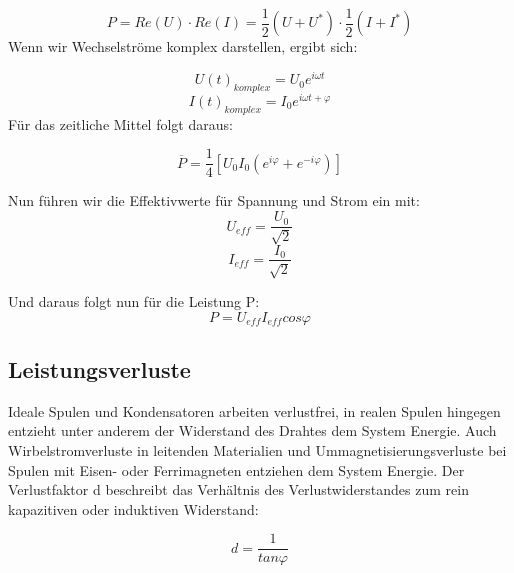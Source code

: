 \begin{equation}
P=Re(U)\cdot Re(I)=\frac{1}{2}(U+U^*)\cdot \frac{1}{2}(I+I^*)
\end{equation}
Wenn wir Wechselströme komplex darstellen, ergibt sich:

\begin{equation}
U(t)_{komplex}=U_{0}e^{i\omega t}
\end{equation}
\begin{equation}
I(t)_{komplex}=I_{0}e^{i\omega t+\varphi}
\end{equation}
Für das zeitliche Mittel folgt daraus:

\begin{equation}
\overline{P}=\frac{1}{4}\left[U_{0}I_{0}(e^{i\varphi }+e^{-i\varphi })\right]
\end{equation}

Nun führen wir die Effektivwerte für Spannung und Strom ein mit:
\begin{equation}
U_{eff}=\frac{U_{0}}{\sqrt{2}}
\end{equation}
\begin{equation}
I_{eff}=\frac{I_{0}}{\sqrt{2}}
\end{equation}

Und daraus folgt nun für die Leistung P:
\begin{equation}
P=U_{eff}I_{eff}cos \varphi
\end{equation}

\subsection{Leistungsverluste}
Ideale Spulen und Kondensatoren arbeiten verlustfrei, in realen Spulen hingegen entzieht unter anderem der Widerstand des Drahtes dem System Energie. Auch Wirbelstromverluste in leitenden Materialien und Ummagnetisierungsverluste bei Spulen mit Eisen- oder Ferrimagneten entziehen dem System Energie.
Der Verlustfaktor d beschreibt das Verhältnis des Verlustwiderstandes zum rein kapazitiven oder induktiven Widerstand:

\begin{equation}
d=\frac{1}{tan \varphi }
\end{equation}

